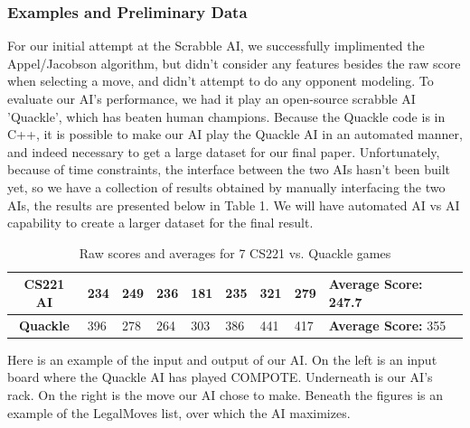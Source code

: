 \documentclass[12pt]{article}
\begin{document}
\subsubsection*{Examples and Preliminary Data}
For our initial attempt at the Scrabble AI, we successfully
implimented the Appel/Jacobson algorithm, but didn't consider any
features besides the raw score when selecting a move, and didn't
attempt to do any opponent modeling.  To evaluate our AI's
performance, we had it play an open-source scrabble AI 'Quackle',
which has beaten human champions. Because the Quackle code is in C++,
it is possible to make our AI play the Quackle AI in an automated
manner, and indeed necessary to get a large dataset for our final
paper. Unfortunately, because of time constraints, the interface
between the two AIs hasn't been built yet, so we have a collection of
results obtained by manually interfacing the two AIs, the results are
presented below in Table 1.  We will have automated AI vs AI
capability to create a larger dataset for the final result. \\

\begin{table}[h]
  \centering
\begin{tabular}{c|l|l|l|l|l|l|l|l}
  \textbf{CS221 AI} & 234 & 249 & 236 & 181 & 235 & 321 & 279 & \textbf{Average Score: } 247.7 \\\hline
  \textbf{Quackle}  & 396 & 278 & 264 & 303 & 386 & 441 & 417 & \textbf{Average Score: } 355\\
\end{tabular}
\caption{Raw scores and averages for 7 CS221 vs. Quackle games}
\end{table}

Here is an example of the input and output of our AI. On the left is an input board where the Quackle AI has played COMPOTE. Underneath is our AI's rack. On the right is the move our AI chose to make. Beneath the figures is an example of the LegalMoves list, over which the AI maximizes. 
\end{document}
